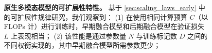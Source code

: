\begin{figure}[t!]
    \centering
    \captionsetup{type=figure}
    \begin{subfigure}[t]{0.48\linewidth}
        
    \end{subfigure}
    \hfill
    \begin{subfigure}[t]{0.48\linewidth}
        
    \end{subfigure}
    \vspace{-3mm}
    \caption{\textbf{原生多模态模型的可扩展性特性。} 基于 \cref{sec:scaling_laws_early} 中的可扩展性规律研究，我们观察到： (1) 在使用相同计算预算 $C$（以 FLOPs 计）进行训练时，早期融合模型和后期融合模型在验证损失 $L$ 上表现相当； (2) 该性能是通过参数量 $N$ 与训练标记数 $D$ 之间的不同权衡实现的，其中早期融合模型所需参数更少；  }
    \label{fig:teaser}
\end{figure}
